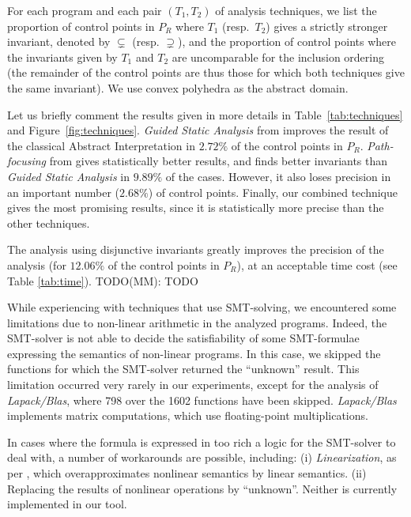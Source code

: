 \documentclass{llncs}
\newcommand{\MM}[1]{{\color{blue} TODO(MM): #1}}
\newcommand{\MM}[1]{}
\begin{document}
For each program and each pair $(T_1,T_2)$ of analysis techniques, we list
the proportion of control points in $P_R$ where $T_1$ (resp.~$T_2$) gives a
strictly stronger invariant, denoted by $\subsetneq$ (resp. $\supsetneq$),
and the proportion of control points where the invariants given by $T_1$ and
$T_2$ are uncomparable for the inclusion ordering (the remainder of the
control points are thus those for which both techniques give the same
invariant). We use convex polyhedra as the abstract domain.

Let us briefly comment the results given in more details in Table~\ref{tab:techniques} and Figure~\ref{fig:techniques}.
\emph{Guided Static Analysis} from \cite{DBLP:conf/sas/GopanR07} improves the
result of the classical Abstract Interpretation in $2.72\%$ of the control points
in $P_R$.
\emph{Path-focusing} from \cite{Monniaux_Gonnord_SAS11} gives
statistically better results, and finds better invariants than \emph{Guided
Static Analysis} in $9.89\%$ of the cases. However, it also loses precision in an
important number ($2.68\%$) of control points.
Finally, our combined technique gives the most promising results, since it is
statistically more precise than the other techniques.

The analysis using disjunctive invariants greatly improves the
precision of the analysis (for $12.06\%$ of the control points in $P_R$), at an
acceptable time cost (see Table \ref{tab:time}). \MM{TODO}

While experiencing with techniques that use SMT-solving, we encountered some
limitations due to non-linear arithmetic in the analyzed programs. Indeed, 
the SMT-solver is not able to decide the satisfiability of some SMT-formulae
expressing the semantics of non-linear programs. 
In this case, we skipped the functions for which the SMT-solver returned the
``unknown'' result.
This limitation occurred very rarely in our experiments, except for the analysis
of \emph{Lapack/Blas}, where 798 over the 1602 functions have been skipped.
\emph{Lapack/Blas} implements matrix computations, which use floating-point multiplications.

In cases where the formula is expressed in too rich a logic for the SMT-solver to deal with, a number of workarounds are possible, including:
(i) \emph{Linearization}, as per \cite{DBLP:conf/vmcai/Mine06}, which overapproximates nonlinear semantics by linear semantics.
(ii) Replacing the results of nonlinear operations by ``unknown''.
Neither is currently implemented in our tool.
\end{document}
